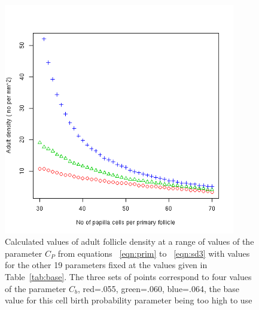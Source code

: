 %

\begin{figure}[!h]
  \centering
   \includegraphics[width=0.9\textwidth]{pavecellnodens.png}
  \caption{Calculated values of adult follicle density at a range of values of the parameter $C_{P}$  from equations ~\ref{eqn:prim} to ~\ref{eqn:sd3} with values for the other 19  parameters fixed at the values given in Table~\ref{tab:base}. The three sets of points correspond to four values of the parameter $C_{b}$, red=.055, green=.060, blue=.064, the base value for this cell birth probability parameter being too high to use}
  \label{fig:pavecellnodens}
\end{figure}

%


